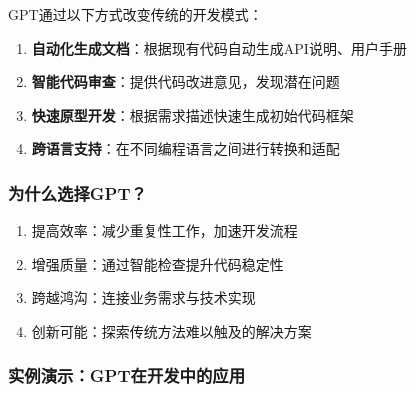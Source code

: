 GPT通过以下方式改变传统的开发模式：

\begin{enumerate}
  \def\labelenumi{\arabic{enumi}.}
  \item
        \textbf{自动化生成文档}：根据现有代码自动生成API说明、用户手册
  \item
        \textbf{智能代码审查}：提供代码改进意见，发现潜在问题
  \item
        \textbf{快速原型开发}：根据需求描述快速生成初始代码框架
  \item
        \textbf{跨语言支持}：在不同编程语言之间进行转换和适配
\end{enumerate}

\hypertarget{ux4e3aux4ec0ux4e48ux9009ux62e9gpt}{%
  \subsubsection{为什么选择GPT？}\label{ux4e3aux4ec0ux4e48ux9009ux62e9gpt}}

\begin{enumerate}
  \def\labelenumi{\arabic{enumi}.}
  \item
        提高效率：减少重复性工作，加速开发流程
  \item
        增强质量：通过智能检查提升代码稳定性
  \item
        跨越鸿沟：连接业务需求与技术实现
  \item
        创新可能：探索传统方法难以触及的解决方案
\end{enumerate}

\hypertarget{ux5b9eux4f8bux6f14ux793agptux5728ux5f00ux53d1ux4e2dux7684ux5e94ux7528}{%
  \subsubsection{实例演示：GPT在开发中的应用}\label{ux5b9eux4f8bux6f14ux793agptux5728ux5f00ux53d1ux4e2dux7684ux5e94ux7528}}

